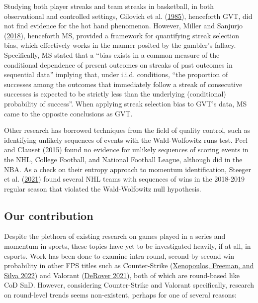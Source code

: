\documentclass{article}
\begin{document}
Studying both player streaks and team streaks in basketball, in both
observational and controlled settings, Gilovich et al.
(\protect\hyperlink{ref-gilovich1985}{1985}), henceforth GVT, did not
find evidence for the hot hand phenomenon. However, Miller and Sanjurjo
(\protect\hyperlink{ref-miller2018}{2018}), henceforth MS, provided a
framework for quantifying streak selection bias, which effectively works
in the manner posited by the gambler's fallacy. Specifically, MS stated
that a ``bias exists in a common measure of the conditional dependence
of present outcomes on streaks of past outcomes in sequential data''
implying that, under i.i.d. conditions, ``the proportion of successes
among the outcomes that immediately follow a streak of consecutive
successes is expected to be strictly less than the underlying
(conditional) probability of success''. When applying streak selection
bias to GVT's data, MS came to the opposite conclusions as GVT.

Other research has borrowed techniques from the field of quality
control, such as identifying unlikely sequences of events with the
Wald-Wolfowitz runs test. Peel and Clauset
(\protect\hyperlink{ref-peel2015}{2015}) found no evidence for unlikely
sequences of scoring events in the NHL, College Football, and National
Football League, although did in the NBA. As a check on their entropy
approach to momentum identification, Steeger et al.
(\protect\hyperlink{ref-steeger2021}{2021}) found several NHL teams with
sequences of wins in the 2018-2019 regular season that violated the
Wald-Wolfowitz null hypothesis.

\hypertarget{our-contribution}{%
\subsection{Our contribution}\label{our-contribution}}

Despite the plethora of existing research on games played in a series
and momentum in sports, these topics have yet to be investigated
heavily, if at all, in esports. Work has been done to examine
intra-round, second-by-second win probability in other FPS titles such
as Counter-Strike (\protect\hyperlink{ref-xenopoulos2022}{Xenopoulos,
Freeman, and Silva 2022}) and Valorant
(\protect\hyperlink{ref-derover2021}{DeRover 2021}), both of which are
round-based like CoD SnD. However, considering Counter-Strike and
Valorant specifically, research on round-level trends seems
non-existent, perhaps for one of several reasons:
\end{document}

